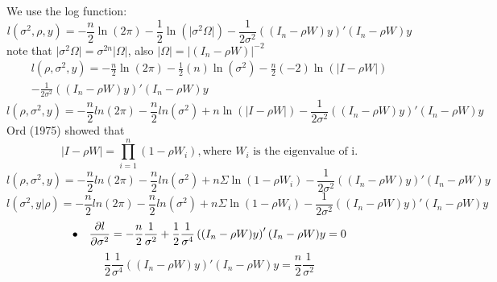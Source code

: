 \documentclass[12pt,onecolumn]{article}
\begin{document}
\begin{enumerate}
\begin{enumerate}
        We use the log function:
        \begin{equation*}
            l(\sigma^2,\rho,y)={-\frac{n}{2}}\ln(2\pi)-{\frac{1}{2}}\ln\left(\lvert\sigma^2\Omega\rvert\right)-{\frac{1}{2\sigma^2}}\left((I_n-\rho{W})y\right)'(I_n-\rho{W})y
        \end{equation*}
        note that $\lvert\sigma^2\Omega\rvert=\sigma^{2n}\lvert\Omega\rvert$, also $\lvert\Omega\rvert=\lvert(I_n-\rho{W})\rvert^{-2}$
        \begin{equation*}
            \begin{split}
            l(\rho,\sigma^2,y)={-\frac{n}{2}}\ln(2\pi)-{\frac{1}{2}}(n)\ln(\sigma^2)-{\frac{n}{2}}(-2)\ln(\lvert{I-\rho{W}}\rvert) \\
            -{\frac{1}{2\sigma^2}}\left((I_n-\rho{W})y\right)'(I_n-\rho{W})y
            \end{split}
        \end{equation*}
        \begin{equation*}
            l(\rho,\sigma^2,y)=-{\frac{n}{2}}ln(2\pi)-{\frac{n}{2}}ln(\sigma^2)+n\ln(\lvert{I-\rho{W}}\rvert)-{\frac{1}{2\sigma^2}}\left((I_n-\rho{W})y\right)'(I_n-\rho{W})y
        \end{equation*}
        Ord (1975) showed that
        \begin{equation*}
            \lvert{I-\rho{W}}\rvert=\prod_{i=1}^{n}(1-\rho{W_i}), \text{where $W_i$ is the eigenvalue of i.}
        \end{equation*}
        \begin{equation*}
            l(\rho,\sigma^2,y)=-{\frac{n}{2}}ln(2\pi)-{\frac{n}{2}}ln(\sigma^2)+n\Sigma\ln(1-\rho{W_i})-{\frac{1}{2\sigma^2}}\left((I_n-\rho{W})y\right)'(I_n-\rho{W})y
        \end{equation*}
        \begin{equation*}
            l(\sigma^2,y|\rho)=-{\frac{n}{2}}ln(2\pi)-{\frac{n}{2}}ln(\sigma^2)+n\Sigma\ln(1-\rho{W_i})-{\frac{1}{2\sigma^2}}\left((I_n-\rho{W})y\right)'(I_n-\rho{W})y
        \end{equation*}
        \begin{equation*}
            \bullet \quad \pdv{l}{\sigma^2}=-{\frac{n}{2}\frac{1}{\sigma^2}}+\frac{1}{2}\frac{1}{\sigma^4}\left((I_n-\rho{W})y\right)'(I_n-\rho{W})y=0
        \end{equation*}
        \begin{equation*}
            \frac{1}{2}\frac{1}{\sigma^4}\left((I_n-\rho{W})y\right)'(I_n-\rho{W})y={\frac{n}{2}\frac{1}{\sigma^2}}

\end{equation*}
\end{enumerate}
\end{enumerate}
\end{document}
